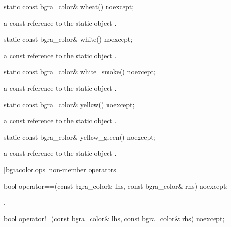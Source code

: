 \begin{itemdecl}
static const bgra_color& wheat() noexcept;
\end{itemdecl}
\begin{itemdescr}
\pnum
\returns
a const reference to the static  object .
\end{itemdescr}

\begin{itemdecl}
static const bgra_color& white() noexcept;
\end{itemdecl}
\begin{itemdescr}
\pnum
\returns
a const reference to the static  object .
\end{itemdescr}

\begin{itemdecl}
static const bgra_color& white_smoke() noexcept;
\end{itemdecl}
\begin{itemdescr}
\pnum
\returns
a const reference to the static  object .
\end{itemdescr}

\begin{itemdecl}
static const bgra_color& yellow() noexcept;
\end{itemdecl}
\begin{itemdescr}
\pnum
\returns
a const reference to the static  object .
\end{itemdescr}

\begin{itemdecl}
static const bgra_color& yellow_green() noexcept;
\end{itemdecl}
\begin{itemdescr}
\pnum
\returns
a const reference to the static  object .
\end{itemdescr}

 [bgracolor.ops] { non-member operators}

\begin{itemdecl}
bool operator==(const bgra_color& lhs, const bgra_color& rhs) noexcept;
\end{itemdecl}
\begin{itemdescr}
\pnum
\returns
{}.
\end{itemdescr}

\begin{itemdecl}
bool operator!=(const bgra_color& lhs, const bgra_color& rhs) noexcept;
\end{itemdecl}
\begin{itemdescr}
\pnum
\returns
{}
\end{itemdescr}

